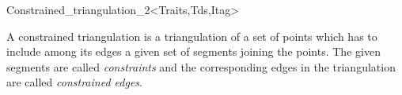 

\begin{ccRefClass}{Constrained_triangulation_2<Traits,Tds,Itag>}  %


\ccDefinition  
A constrained triangulation is a triangulation of a set of points
which has to include among its edges 
a given set of segments
joining the points. The given segments are
called {\em constraints}  and the corresponding 
edges in the triangulation are called {\em constrained edges}. 


\end{ccRefClass}
